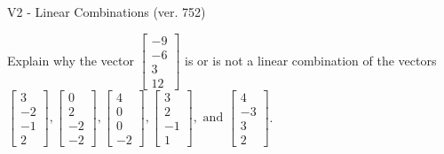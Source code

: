 \begin{exercise}
  \begin{exerciseTitle}V2 - Linear Combinations (ver. 752)\end{exerciseTitle}
  \begin{exerciseStatement}
    Explain why the vector \(\left[\begin{array}{c}
-9 \\
-6 \\
3 \\
12
\end{array}\right]\)  is or is not a linear 
	combination of the vectors \(\left[\begin{array}{c}
3 \\
-2 \\
-1 \\
2
\end{array}\right] , \left[\begin{array}{c}
0 \\
2 \\
-2 \\
-2
\end{array}\right] , \left[\begin{array}{c}
4 \\
0 \\
0 \\
-2
\end{array}\right] , \left[\begin{array}{c}
3 \\
2 \\
-1 \\
1
\end{array}\right] , \text{ and } \left[\begin{array}{c}
4 \\
-3 \\
3 \\
2
\end{array}\right]\).
	



\end{exerciseStatement}
\end{exercise}
